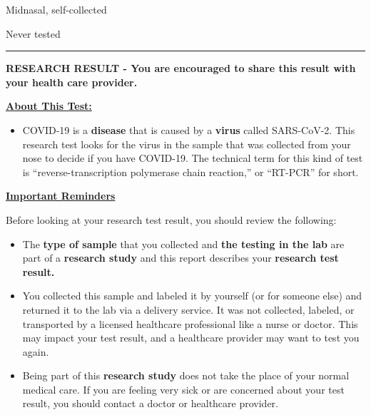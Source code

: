 \documentclass[10pt]{article}
\newcommand{\PageLine}{\rule{\textwidth}{0.25mm}}
\begin{document}
\begin{description}[font=\normalfont,align=left,labelwidth=12em]
\item [\textbf{\VAR{pat_name|e}}]
\item [\textbf{Date of Birth}] 
\item [\textbf{Specimen}] Midnasal, self-collected
\item [\textbf{Collection Barcode}] 
\item [\textbf{Collection Date}] 
\item [\textbf{Report Date}]
  Never tested
\end{description}

\PageLine

\begin{center}
\Large
\textbf{RESEARCH RESULT - You are encouraged to share this result with your
  health care provider.}
\end{center}

\bigskip

\large \underline{\textbf{About This Test:}}

\begin{itemize}
\item

  COVID-19 is a \textbf{disease} that is caused by a \textbf{virus} called
  SARS-CoV-2. This research test looks for the virus in the sample that was
  collected from your nose to decide if you have COVID-19. The technical term
  for this kind of test is “reverse-transcription polymerase chain reaction,” or
  “RT-PCR” for short.

\end{itemize}

\bigskip

\large \underline{\textbf{Important Reminders}}

Before looking at your research test result, you should review the following:

\begin{itemize}
\item

  The \textbf{type of sample} that you collected and \textbf{the testing in the
  lab} are part of a \textbf{research study} and this report describes your
  \textbf{research test result.}

\item

  You collected this sample and labeled it by yourself (or for someone else) and
  returned it to the lab via a delivery service. It was not collected, labeled,
  or transported by a licensed healthcare professional like a nurse or doctor.
  This may impact your test result, and a healthcare provider may want to test
  you again.

\item

  Being part of this \textbf{research study} does not take the place of your
  normal medical care. If you are feeling very sick or are concerned about your
  test result, you should contact a doctor or healthcare provider.

\end{itemize}
\end{document}
